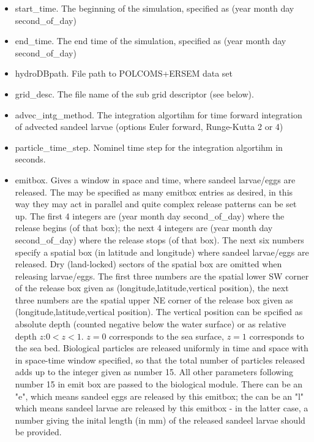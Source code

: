 \begin{itemize}
  \item start\_time. The beginning of the simulation, specified as (year  month  day  second\_of\_day)
  \item end\_time. The end time of the simulation, specified as (year  month  day  second\_of\_day) 

  \item hydroDBpath. File path to POLCOMS+ERSEM data set
  \item grid\_desc. The file name of the sub grid descriptor (see below).

  \item advec\_intg\_method. The integration algortihm for time forward integration
        of advected sandeel larvae (options Euler forward, Runge-Kutta 2 or 4)
  \item particle\_time\_step. Nominel time step for the integration algortihm 
        in seconds.

\item emitbox. Gives a window in space and time, where sandeel larvae/eggs are released.
      The may be specified as many emitbox entries as desired, in this way they
      may act in parallel and quite complex release patterns can be set up.
      The first 4 integers are (year  month  day  second\_of\_day) where the release
      begins (of that box); the next 4 integers are (year  month  day  second\_of\_day) where the release
      stops (of that box). 
      The next six numbers specify a spatial box (in latitude and longitude) where
      sandeel larvae/eggs are released. Dry (land-locked) sectors of the spatial box are omitted when
      releasing larvae/eggs. The first three numbers are the spatial lower SW corner of the release box
      given as (longitude,latitude,vertical position), the next three numbers are the spatial upper 
      NE corner of the release box given as (longitude,latitude,vertical position).
      The vertical position can be spcified as absolute depth (counted negative below the water surface)
      or as relative depth $z$:$ 0 < z < 1$. 
      $z=0$ corresponds to the sea surface, 
      $z=1$ corresponds to the sea bed.
      Biological particles are released uniformly in time and space with in space-time window
      specified, so that the total number of particles released adds up to the integer given as 
      number 15. All other parameters following number 15 in emit box are passed to the biological module.
      There can be an "e", which means sandeel eggs are released by this emitbox; the can be an "l"
      which means sandeel larvae are released by this emitbox - in the latter case, a number giving 
      the inital length (in mm) of the released sandeel larvae should be provided.


\end{itemize}
